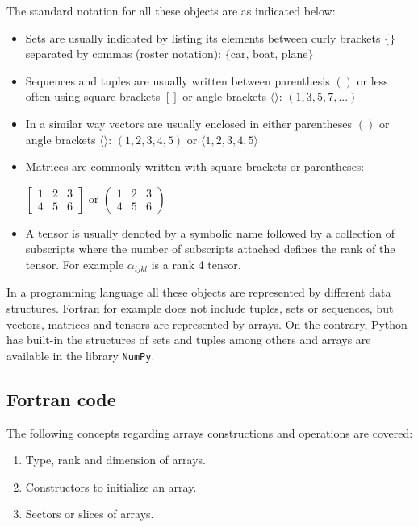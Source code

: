 The standard notation for all these objects are as indicated below:
\begin{itemize}
    \item Sets are usually indicated by listing its elements between curly brackets $\{\}$ separated by commas (roster notation): $\{\textrm{car, boat, plane}\}$
    \item Sequences and tuples are usually written between parenthesis $()$ or less often using square brackets $[]$ or angle brackets $\langle \rangle$: $(1,3,5,7,...)$
    \item In a similar way vectors are usually enclosed in either parentheses $()$ or angle brackets $\langle \rangle$: $(1,2,3,4,5)$ or $\langle1,2,3,4,5 \rangle$
    \item Matrices are commonly written with square brackets or parentheses:
    
    $
    \begin{bmatrix}
        1 & 2 & 3 \\
        4 & 5 & 6
    \end{bmatrix} 
    $ or $
    \begin{pmatrix}
        1 & 2 & 3\\
        4 & 5 & 6
    \end{pmatrix}   
    $
    \item A tensor is usually denoted by a symbolic name followed by a collection of subscripts where the number of subscripts attached defines the rank of the tensor.
    For example $\alpha_{ijkl}$ is a rank 4 tensor.
\end{itemize}

In a programming language all these objects are represented by different data structures.
Fortran for example does not include tuples, sets or sequences, but vectors, matrices and tensors are represented by arrays. 
On the contrary, Python has built-in the structures of sets and tuples among others and arrays are available in the library \texttt{NumPy}.  



        \newpage
        \subsection*{Fortran code}


The following concepts regarding arrays constructions and operations are covered:
\begin{enumerate} 
    \item Type, rank and dimension of arrays.
    \item Constructors to initialize an array. 
    \item Sectors or slices of arrays. 
\end{enumerate} 


